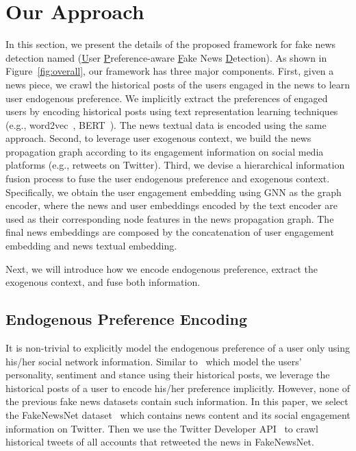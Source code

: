 \documentclass[sigconf]{acmart}
\newcommand\UPFD{\xspace}
\begin{document}
 \section{Our Approach}
\label{sec02:method}
In this section, we present the details of the proposed framework for fake news detection named \UPFD (\underline{U}ser \underline{P}reference-aware \underline{F}ake News \underline{D}etection).
As shown in Figure~\ref{fig:overall}, our framework has three major components.
First, given a news piece, we crawl the historical posts of the users engaged in the news to learn user endogenous preference.
We implicitly extract the preferences of engaged users by encoding historical posts using text representation learning techniques (e.g., word2vec~\cite{mikolov2013efficient}, BERT~\cite{devlin2018bert}).
The news textual data is encoded using the same approach.
Second, to leverage user exogenous context, we build the news propagation graph according to its engagement information on social media platforms (e.g., retweets on Twitter).
Third, we devise a hierarchical information fusion process to fuse the user endogenous preference and exogenous context.
Specifically, we obtain the user engagement embedding using GNN as the graph encoder, where the news and user embeddings encoded by the text encoder are used as their corresponding node features in the news propagation graph.
The final news embeddings are composed by the concatenation of user engagement embedding and news textual embedding.

Next, we will introduce how we encode endogenous preference, extract the exogenous context, and fuse both information.

\subsection{Endogenous Preference Encoding}
\label{sec:text_encoding}

It is non-trivial to explicitly model the endogenous preference of a user only using his/her social network information.
Similar to~\cite{ahmad2017personality, khattri2015your, qian2018leveraging} which model the users' personality, sentiment and stance using their historical posts, we leverage the historical posts of a user to encode his/her preference implicitly.
However, none of the previous fake news datasets contain such information.
In this paper, we select the FakeNewsNet dataset~\cite{shu2018fakenewsnet} which contains news content and its social engagement information on Twitter.
Then we use the Twitter Developer API~\cite{twitterapi} to crawl historical tweets of all accounts that retweeted the news in FakeNewsNet.
\end{document}
